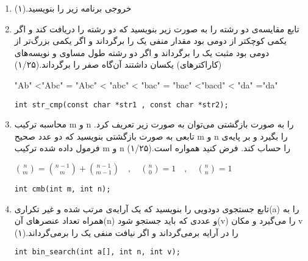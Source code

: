 \documentclass[12pt, a4paper]{article}
\begin{document}
\begin{enumerate}
\item
خروجی برنامه زیر را بنویسید.(۱)

\begin{latin}

\end{latin}

\item
تابع مقایسه‌ی دو رشته را به صورت زیر بنویسید که دو رشته را دریافت کند و اگر یکمی
  کوچکتر از دومی
بود مقدار منفی یک را برگرداند و اگر یکمی بزرگ‌تر از دومی بود مثبت یک را برگرداند و اگر دو رشته طول مساوی و نویسه‌های (کاراکترهای)
یکسان داشتند آن‌گاه صفر را برگرداند.(۱/۲۵)
\\
\begin{latin}
"Ab" <"Abc" = "Abc" < "abc" < "bac" = "bac" <"bacd" < "da" ="da"  \\
\begin{lstlisting}[numbers=none] 
int str_cmp(const char *str1 , const char *str2);
\end{lstlisting}
\end{latin}

\item
محاسبه ترکیب m و n را به صورت بازگشتی می‌توان به صورت
زیر
تعریف کرد. تابعی به صورت بازگشتی بنویسید که دو عدد صحیح m و n را بگیرد و بر پایه‌ی فرمول داده شده ترکیب m و n را حساب کند. فرض کنید همواره  
است.(۱/۲۵)
\\

\begin{latin}
\begin{math}
\binom{n}{m} = \binom{n-1}{m} + \binom{n-1}{m-1} \quad  ,  \quad  \binom{n}{0} =  1  \quad  ,  \quad  \binom{n}{n} =  1 
\end{math}
\end{latin}

\begin{latin}
\begin{lstlisting}[numbers=none] 
int cmb(int m, int n);
\end{lstlisting}
\end{latin}

\item
تابع جستجوی دودویی را بنویسید که یک آرایه‌ی مرتب شده و غیر تکراری(a) را به همراه تعداد عنصرهای آن(n) و عددی که باید
 جستجو شود(v) را می‌گیرد و مکان v را در آرایه برمی‌گرداند و اگر نیافت منفی یک را برمی‌گرداند.(۱)
\\
\begin{latin}
\begin{lstlisting}[numbers=none] 
int bin_search(int a[], int n, int v);
\end{lstlisting}
\end{latin}


\end{enumerate}
\end{document}

